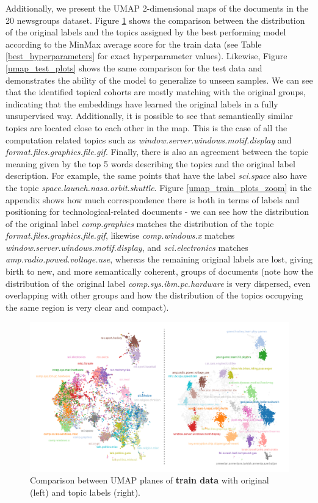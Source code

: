 \documentclass[a4paper]{article}
\begin{document}
Additionally, we present the UMAP 2-dimensional maps of the documents in the 20 newsgroups dataset. Figure \ref{umap_train_plots} shows the comparison between the distribution of the original labels and the topics assigned by the best performing model according to the MinMax average score for the train data (see Table \ref{best_hyperparameters} for exact hyperparameter values). Likewise, Figure \ref{umap_test_plots} shows the same comparison for the test data and demonstrates the ability of the model to generalize to unseen samples. We can see that the identified topical cohorts are mostly matching with the original groups, indicating that the embeddings have learned the original labels in a fully unsupervised way. Additionally, it is possible to see that semantically similar topics are located close to each other in the map. This is the case of all the computation related topics such as \emph{window.server.windows.motif.display} and \emph{format.files.graphics.file.gif}. Finally, there is also an agreement between the topic meaning given by the top 5 words describing the topics and the original label description. For example, the same points that have the label \emph{sci.space} also have the topic \emph{space.launch.nasa.orbit.shuttle}. Figure \ref{umap_train_plots_zoom} in the appendix shows how much correspondence there is both in terms of labels and positioning for technological-related documents - we can see how the distribution of the original label \emph{comp.graphics} matches the distribution of the topic \emph{format.files.graphics.file.gif}, likewise \emph{comp.windows.x} matches \emph{window.server.windows.motif.display}, and \emph{sci.electronics} matches \emph{amp.radio.powed.voltage.use}, whereas the remaining original labels are lost, giving birth to new, and more semantically coherent, groups of documents (note how the distribution of the original label \emph{comp.sys.ibm.pc.hardware} is very dispersed, even overlapping with other groups and how the distribution of the topics occupying the same region is very clear and compact).

\begin{figure}[H]
	\centering
	\includegraphics[width=\linewidth]{./assets/umap_train_plots}
	\caption{Comparison between UMAP planes of \textbf{train data} with original (left) and topic labels (right).}
	\label{umap_train_plots}
\end{figure}
\end{document}
